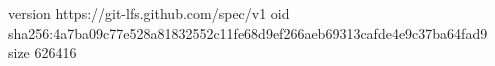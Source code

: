version https://git-lfs.github.com/spec/v1
oid sha256:4a7ba09c77e528a81832552c11fe68d9ef266aeb69313cafde4e9c37ba64fad9
size 626416
